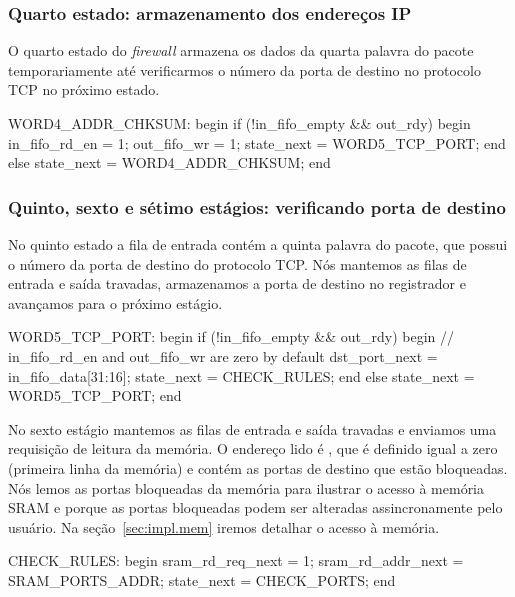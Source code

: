 \subsubsection*{Quarto estado: armazenamento dos endereços IP}

O quarto estado do \emph{firewall} armazena os dados da quarta palavra
do pacote temporariamente até verificarmos o número da porta de destino
no protocolo TCP no próximo estado.

\begin{verilogcode}
  WORD4_ADDR_CHKSUM: begin
     if (!in_fifo_empty && out_rdy) begin
        in_fifo_rd_en = 1;
        out_fifo_wr = 1;
        state_next = WORD5_TCP_PORT;
     end
     else
        state_next = WORD4_ADDR_CHKSUM;
  end
\end{verilogcode}

\subsubsection*{Quinto, sexto e sétimo estágios: verificando porta de
destino}

No quinto estado a fila de entrada contém a quinta palavra do pacote,
que possui o número da porta de destino do protocolo TCP.  Nós mantemos
as filas de entrada e saída travadas, armazenamos a porta de destino no
registrador  e avançamos para o próximo estágio.

\begin{verilogcode}
  WORD5_TCP_PORT: begin
     if (!in_fifo_empty && out_rdy) begin
        // in_fifo_rd_en and out_fifo_wr are zero by default
        dst_port_next = in_fifo_data[31:16];
        state_next = CHECK_RULES;
     end
     else
        state_next = WORD5_TCP_PORT;
  end
\end{verilogcode}

No sexto estágio mantemos as filas de entrada e saída travadas e
enviamos uma requisição de leitura da memória.  O endereço lido é
, que é definido igual a zero (primeira linha da
memória) e contém as portas de destino que estão bloqueadas.  Nós lemos
as portas bloqueadas da memória para ilustrar o acesso à memória SRAM e
porque as portas bloqueadas podem ser alteradas assincronamente pelo
usuário.  Na seção~\ref{sec:impl.mem} iremos detalhar o acesso à
memória.

\begin{verilogcode}
  CHECK_RULES: begin
     sram_rd_req_next = 1;
     sram_rd_addr_next = SRAM_PORTS_ADDR;
     state_next = CHECK_PORTS;
  end
\end{verilogcode}

